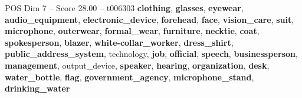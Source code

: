 \begin{textsample}{POS Dim 7 – Score 28.00 – t006303}  \label{ex:f7_pos_012}
\textbf{clothing}, \textbf{glasses}, \textbf{eyewear}, \textbf{audio\_equipment}, \textbf{electronic\_device}, \textbf{forehead}, \textbf{face}, \textbf{vision\_care}, \textbf{suit}, \textbf{microphone}, \textbf{outerwear}, \textbf{formal\_wear}, \textbf{furniture}, \textbf{necktie}, \textbf{coat}, \textbf{spokesperson}, \textbf{blazer}, \textbf{white-collar\_worker}, \textbf{dress\_shirt}, \textbf{public\_address\_system}, technology, \textbf{job}, \textbf{official}, \textbf{speech}, \textbf{businessperson}, \textbf{management}, output\_device, \textbf{speaker}, \textbf{hearing}, \textbf{organization}, \textbf{desk}, \textbf{water\_bottle}, \textbf{flag}, \textbf{government\_agency}, \textbf{microphone\_stand}, \textbf{drinking\_water}

\end{textsample}
